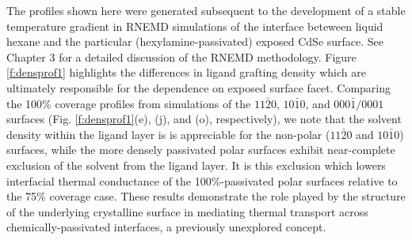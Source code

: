 The profiles shown here were generated subsequent to the development of a stable temperature gradient in RNEMD simulations of the interface beteween liquid hexane and the particular (hexylamine-passivated) exposed CdSe surface. See Chapter 3 for a detailed discussion of the RNEMD methodology. Figure \ref{f:densprof1} highlights the differences in ligand grafting density which are ultimately responsible for the dependence on exposed surface facet. Comparing the 100\% coverage profiles from simulations of the $11\bar{2}0$, $10\bar{1}0$, and $000\bar{1}/0001$ surfaces (Fig. \ref{f:densprof1}(e), (j), and (o), respectively), we note that the solvent density within the ligand layer is is appreciable for the non-polar ($11\bar{2}0$ and $10\bar{1}0$) surfaces, while the more densely passivated polar surfaces exhibit near-complete exclusion of the solvent from the ligand layer. It is this exclusion which lowers interfacial thermal conductance of the 100\%-passivated polar surfaces relative to the 75\% coverage case. These results demonstrate the role played by the structure of the underlying crystalline surface in mediating thermal transport across chemically-passivated interfaces, a previously unexplored concept.


